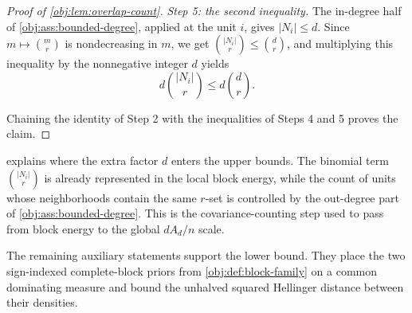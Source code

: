 \documentclass[11pt]{article}
\begin{document}
\begin{proof}[Proof of \cref{obj:lem:overlap-count}]
\emph{Step 5: the second inequality.}  The in-degree half of \cref{obj:ass:bounded-degree}, applied at the unit \(i\), gives \(|N_i|\le d\).  Since \(m\mapsto\binom{m}{r}\) is nondecreasing in \(m\), we get \(\binom{|N_i|}{r}\le\binom{d}{r}\), and multiplying this inequality by the nonnegative integer \(d\) yields
\[
d\binom{|N_i|}{r}\le d\binom{d}{r}.
\]

Chaining the identity of Step 2 with the inequalities of Steps 4 and 5 proves the claim. %
\end{proof}

 explains where the extra factor \(d\) enters the upper bounds. The binomial term \(\binom{|N_i|}{r}\) is already represented in the local block energy, while the count of units whose neighborhoods contain the same \(r\)-set is controlled by the out-degree part of \cref{obj:ass:bounded-degree}. This is the covariance-counting step used to pass from block energy to the global \(dA_d/n\) scale.

The remaining auxiliary statements support the lower bound. They place the two sign-indexed complete-block priors from \cref{obj:def:block-family} on a common dominating measure and bound the unhalved squared Hellinger distance between their densities.
\end{document}
